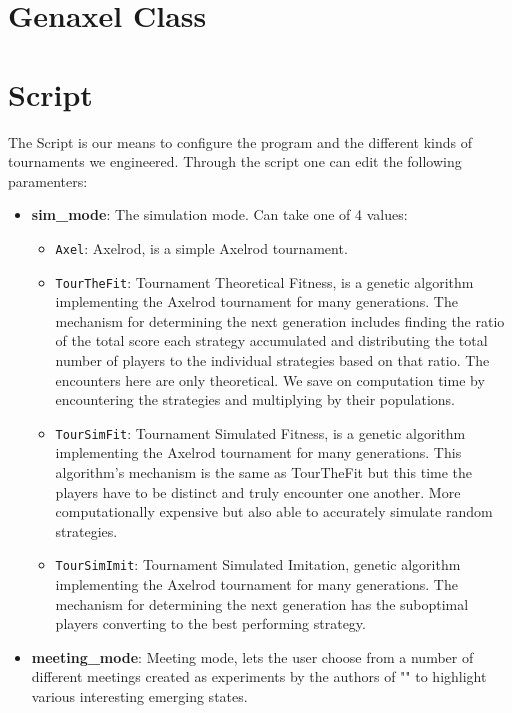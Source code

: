\section{Genaxel Class}

\section{Script}
The Script is our means to configure the program and the different kinds of tournaments we engineered. Through the script one can edit the following paramenters:
\begin{itemize}
    \item \textbf{sim_mode}: The simulation mode. Can take one of 4 values:
        \begin{itemize}
            \item \texttt{Axel}: Axelrod, is a simple Axelrod tournament.
            \item \texttt{TourTheFit}: Tournament Theoretical Fitness, is a genetic algorithm implementing the Axelrod tournament for many generations. The mechanism for determining the next generation includes finding the ratio of the total score each strategy accumulated and distributing the total number of players to the individual strategies based on that ratio. The encounters here are only theoretical. We save on computation time by encountering the strategies and multiplying by their populations. 
            \item \texttt{TourSimFit}: Tournament Simulated Fitness, is a genetic algorithm implementing the Axelrod tournament for many generations. This algorithm's mechanism is the same as TourTheFit but this time the players have to be distinct and truly encounter one another. More computationally expensive but also able to accurately simulate random strategies.
            \item \texttt{TourSimImit}: Tournament Simulated Imitation, genetic algorithm implementing the Axelrod tournament for many generations. The mechanism for determining the next generation has the suboptimal players converting to the best performing strategy.
        \end{itemize}
    \item \textbf{meeting_mode}: Meeting mode, lets the user choose from a number of different meetings created as experiments by the authors of "" to highlight various interesting emerging states.
\end{itemize}

